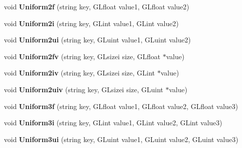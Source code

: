 \begin{DoxyCompactItemize}
\item 
\hypertarget{class_shader_program_a735295344f69c7daf9e608bcd3744255}{void {\bfseries Uniform2f} (string key, G\-Lfloat value1, G\-Lfloat value2)}\label{class_shader_program_a735295344f69c7daf9e608bcd3744255}

\item 
\hypertarget{class_shader_program_ad400fa02be2f9992d1fedc39965f8409}{void {\bfseries Uniform2i} (string key, G\-Lint value1, G\-Lint value2)}\label{class_shader_program_ad400fa02be2f9992d1fedc39965f8409}

\item 
\hypertarget{class_shader_program_acd692c15aa770dfe226fd22b7cdc4e05}{void {\bfseries Uniform2ui} (string key, G\-Luint value1, G\-Luint value2)}\label{class_shader_program_acd692c15aa770dfe226fd22b7cdc4e05}

\item 
\hypertarget{class_shader_program_a937b3ade36578399f6f1b7071ec4695c}{void {\bfseries Uniform2fv} (string key, G\-Lsizei size, G\-Lfloat $\ast$value)}\label{class_shader_program_a937b3ade36578399f6f1b7071ec4695c}

\item 
\hypertarget{class_shader_program_a36263719031c1c8e6647b89eb0db87db}{void {\bfseries Uniform2iv} (string key, G\-Lsizei size, G\-Lint $\ast$value)}\label{class_shader_program_a36263719031c1c8e6647b89eb0db87db}

\item 
\hypertarget{class_shader_program_aa05e8421136337de44738d7dd0a3aa74}{void {\bfseries Uniform2uiv} (string key, G\-Lsizei size, G\-Luint $\ast$value)}\label{class_shader_program_aa05e8421136337de44738d7dd0a3aa74}

\item 
\hypertarget{class_shader_program_a7ddf5f216a1605b0e8ee012a30b91dd9}{void {\bfseries Uniform3f} (string key, G\-Lfloat value1, G\-Lfloat value2, G\-Lfloat value3)}\label{class_shader_program_a7ddf5f216a1605b0e8ee012a30b91dd9}

\item 
\hypertarget{class_shader_program_a5962f377a1a027c77ab3f93f926ce525}{void {\bfseries Uniform3i} (string key, G\-Lint value1, G\-Lint value2, G\-Lint value3)}\label{class_shader_program_a5962f377a1a027c77ab3f93f926ce525}

\item 
\hypertarget{class_shader_program_af265906f7c4578357413d30af5afae84}{void {\bfseries Uniform3ui} (string key, G\-Luint value1, G\-Luint value2, G\-Luint value3)}\label{class_shader_program_af265906f7c4578357413d30af5afae84}


\end{DoxyCompactItemize}

